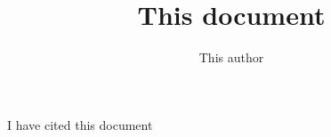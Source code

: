 \documentclass[conference]{IEEEtran}
\title{This document}
\author{This author}
\begin{document}
\maketitle

\begin{abstract}
\lipsum[1]
\end{abstract}

\lipsum[2-6]
I have cited this document \cite{Khoe:1994:CML:2288694.2294265}



\end{document}
